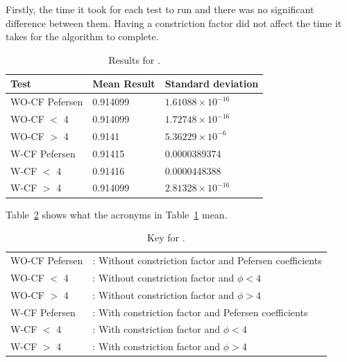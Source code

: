 \documentclass{pdfmx4020}
\begin{document}
      Firstly, the time it took for each test to run and there was no significant difference between them. Having a constriction factor did not affect the time it takes for the algorithm to complete. 

        \begin{table}[H]
          \setlength{\extrarowheight}{2.0pt}
          \begin{tabular}{|l|l|l|}
            \hline
            Test & Mean Result & Standard deviation \\
            \hline
            WO-CF Pefersen & 0.914099 & $1.61088\times10^{-16}$ \\
            \hline
            WO-CF $<$ 4 & 0.914099 & $1.72748\times10^{-16}$ \\
            \hline
            WO-CF $>$ 4 & 0.9141 & $5.36229\times10^{-6}$ \\
            \hline
            W-CF Pefersen & 0.91415 & 0.0000389374 \\
            \hline
            W-CF $<$ 4 & 0.91416 & 0.0000448388 \\
            \hline
            W-CF $>$ 4 & 0.914099 & $2.81328\times10^{-16}$ \\
            \hline
          \end{tabular}
          \caption{Results for .}
          \label{table:constriction_factor_results}
        \end{table}

      Table~\ref{table:key_constriction_factor_results} shows what the acronyms in Table~\ref{table:constriction_factor_results} mean. 

        \begin{table}[H]
          \setlength{\extrarowheight}{2.0pt}
          \begin{tabular}{ l l }
            WO-CF Pefersen & : Without constriction factor and Pefersen coefficients  \\
            WO-CF $<$ 4 & : Without constriction factor and $\phi < 4$ \\
            WO-CF $>$ 4 & : Without constriction factor and $\phi > 4$ \\
            W-CF Pefersen & : With constriction factor and Pefersen coefficients  \\
            W-CF $<$ 4 & : With constriction factor and $\phi < 4$ \\
            W-CF $>$ 4 & : With constriction factor and $\phi > 4$ \\
          \end{tabular}
          \caption{Key for .}
          \label{table:key_constriction_factor_results}
        \end{table}
\end{document}

